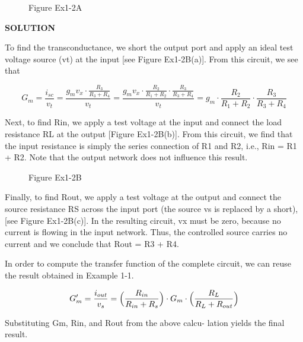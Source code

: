 \documentclass[
  11pt,
  letterpaper,
  abstract]{scrbook}
\begin{document}
\begin{figure}


\caption{\label{fig-ex-1.2a}Figure Ex1-2A}

\end{figure}%

\textbf{SOLUTION}

To find the transconductance, we short the output port and apply an
ideal test voltage source (vt) at the input {[}see Figure Ex1-2B(a){]}.
From this circuit, we see that

\[
G_m = \frac{i_{sc}}{v_t} = \frac{g_m v_x \cdot \frac{R_3}{R_3 + R_4}}{v_t} = \frac{g_m v_x \cdot \frac{R_2}{R_1 + R_2} \cdot \frac{R_3}{R_3 + R_4}}{v_t} = g_m \cdot \frac{R_2}{R_1 + R_2} \cdot \frac{R_3}{R_3 + R_4}
\]

Next, to find Rin, we apply a test voltage at the input and connect the
load resistance RL at the output {[}Figure Ex1-2B(b){]}. From this
circuit, we find that the input resistance is simply the series
connection of R1 and R2, i.e., Rin = R1 + R2. Note that the output
network does not influence this result.

\begin{figure}


\caption{\label{fig-ex-1.2b}Figure Ex1-2B}

\end{figure}%

Finally, to find Rout, we apply a test voltage at the output and connect
the source resistance RS across the input port (the source vs is
replaced by a short), {[}see Figure Ex1-2B(c){]}. In the resulting
circuit, vx must be zero, because no current is flowing in the input
network. Thus, the controlled source carries no current and we conclude
that Rout = R3 + R4.

In order to compute the transfer function of the complete circuit, we
can reuse the result obtained in Example 1-1.

\[
G'_m = \frac{i_{out}}{v_s} = \Bigl(\frac{R_{in}}{R_{in} + R_s}\Bigr) \cdot G_m \cdot \Bigl(\frac{R_{L}}{R_{L} + R_{out}}\Bigr)
\]

Substituting Gm, Rin, and Rout from the above calcu- lation yields the
final result.
\end{document}
